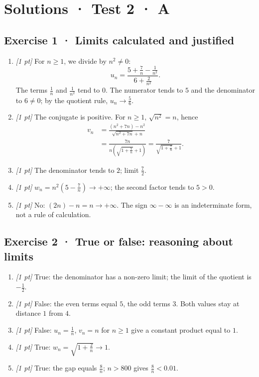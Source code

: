 \ifprof\clearpage

\section*{Solutions · Test 2 · A}\label{cor:2-3}

\subsection*{Exercise 1 · Limits calculated and justified}\begin{enumerate}

\item \textit{[1 pt]} For $n\ge1$, we divide by $n^2\ne0$:
\[u_n=\frac{5+\frac{7}{n}-\frac{1}{n^2}}{6+\frac{2}{n^2}}.\]
The terms $\frac{1}{n}$ and $\frac{1}{n^2}$ tend to $0$. The numerator tends to $5$ and the denominator to $6\ne0$; by the quotient rule, $u_n\to\frac{5}{6}$.

\item \textit{[1 pt]} The conjugate is positive. For $n\ge1$, $\sqrt{n^2}=n$, hence
\[\begin{aligned}v_n&=\frac{(n^2+7n)-n^2}{\sqrt{n^2+7n}+n}\\&=\frac{7n}{n(\sqrt{1+\frac{7}{n}}+1)}=\frac{7}{\sqrt{1+\frac{7}{n}}+1}.\end{aligned}\]

\item \textit{[1 pt]} The denominator tends to $2$; limit $\frac{7}{2}$.

\item \textit{[1 pt]} $w_n=n^2(5-\frac{7}{n})\to+\infty$; the second factor tends to $5>0$.

\item \textit{[1 pt]} No: $(2n)-n=n\to+\infty$. The sign $\infty-\infty$ is an indeterminate form, not a rule of calculation.

\end{enumerate}

\subsection*{Exercise 2 · True or false: reasoning about limits}\begin{enumerate}

\item \textit{[1 pt]} True: the denominator has a non-zero limit; the limit of the quotient is $-\frac{1}{2}$.

\item \textit{[1 pt]} False: the even terms equal $5$, the odd terms $3$. Both values stay at distance $1$ from $4$.

\item \textit{[1 pt]} False: $u_n=\frac{1}{n}$, $v_n=n$ for $n\ge1$ give a constant product equal to $1$.

\item \textit{[1 pt]} True: $w_n=\sqrt{1+\frac{2}{n}}\to1$.

\item \textit{[1 pt]} True: the gap equals $\frac{8}{n}$; $n>800$ gives $\frac{8}{n}<0.01$.

\end{enumerate}

